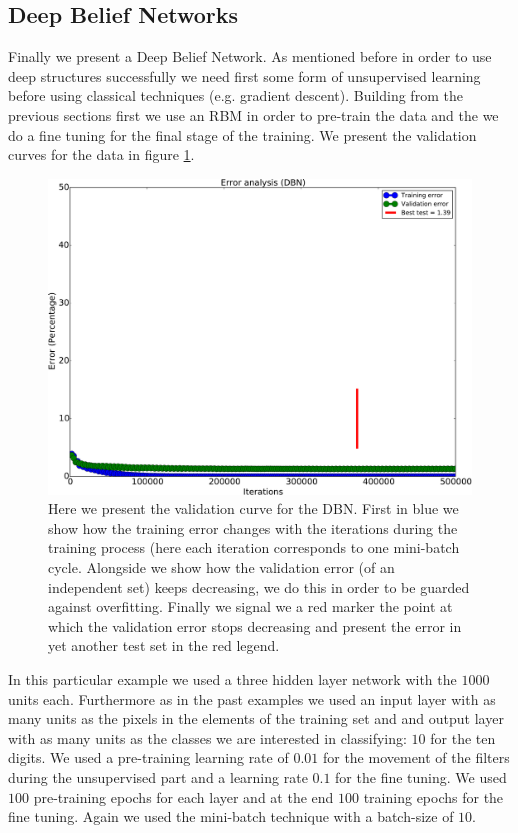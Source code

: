 \documentclass[11pt,a4paper]{article}
\begin{document}
\subsection{Deep Belief Networks}

Finally we present a Deep Belief Network. As mentioned before in order to use deep structures successfully we need first some form of unsupervised learning before using classical techniques (e.g. gradient descent). Building from the previous sections first we use an RBM in order to pre-train the data and the we do a fine tuning for the final stage of the training. We present the validation curves for the data in figure \ref{fig:dbn_validation}. 

\begin{center}
\begin{figure}[H]
\centering
\includegraphics[scale=.45]{dbn_validation.pdf} 
\caption{Here we present the validation curve for the DBN. First in blue we show how the training error changes with the iterations during the training process (here each iteration corresponds to one mini-batch cycle. Alongside we show how the validation error (of an independent set) keeps decreasing, we do this in order to be guarded against overfitting. Finally we signal we a red marker the point at which the validation error stops decreasing and present the error in yet another test set in the red legend.}
\label{fig:dbn_validation}
\end{figure} 
\end{center}

In this particular example we used a three  hidden layer network with the $1000$ units each. Furthermore as in the past examples we used an input layer with as many units as the pixels in the elements of the training set and and output layer with as many units as the classes we are interested in classifying: $10$ for the ten digits. We used a pre-training learning rate of $0.01$ for the movement of the filters during the unsupervised part and a learning rate $0.1$ for the fine tuning. We used $100$ pre-training epochs for each layer and at the end $100$ training epochs for the fine tuning. Again we used the mini-batch technique with a batch-size of $10$.
\end{document}
